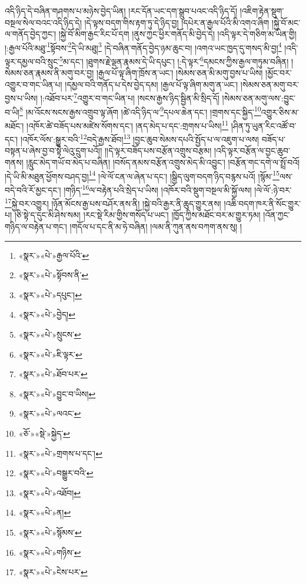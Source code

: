 འདི་ཉིད་དེ་བཞིན་གཤགས་པ་མཉེས་བྱེད་ཡིན། །རང་དོན་ཡང་དག་སྒྲུབ་པའང་འདི་ཉིད་དོ། །འཇིག་རྟེན་སྡུག་བསྔལ་སེལ་བའང་འདི་ཉིད་དེ། །དེ་ལྟས་བདག་གིས་རྟག་ཏུ་དེ་ཉིད་བྱ། །དཔེར་ན་རྒྱལ་པོའི་མི་འགའ་ཞིག །སྐྱེ་བོ་མང་ལ་གནོད་བྱེད་ཀྱང་། །སྐྱེ་བོ་མིག་རྒྱང་རིང་པོ་དག །ནུས་ཀྱང་ཕྱིར་གནོད་མི་བྱེད་དེ། །འདི་ལྟར་དེ་གཅིག་མ་ཡིན་གྱི། །:རྒྱལ་པོའི་མཐུ་\footnote{«སྣར་»«པེ་»རྒྱལ་པོའི་}སྟོབས་\footnote{«སྣར་»«པེ་»སྟོབས་ནི་}དེ་ཡི་མཐུ།\footnote{«སྣར་»«པེ་»དཔུང་།} །དེ་བཞིན་གནོད་བྱེད་ཉམ་ཆུང་བ། །འགའ་ཡང་ཁྱད་དུ་གསད་མི་བྱ།\footnote{«སྣར་»«པེ་»བྱེད།} །འདི་ལྟར་དམྱལ་བའི་སྲུང་\footnote{«སྣར་»«པེ་»སྲུངས་}མ་དང་། །ཐུགས་རྗེ་ལྡན་རྣམས་དེ་ཡི་དཔུང་། །:དེ་ལྟར་\footnote{«སྣར་»«པེ་»ཇི་ལྟར་}དམངས་ཀྱིས་རྒྱལ་གཏུམ་བཞིན། །སེམས་ཅན་རྣམས་ནི་མགུ་བར་བྱ། །རྒྱལ་པོ་ལྟ་ཞིག་ཁྲོས་ན་ཡང་། །སེམས་ཅན་མི་མགུ་བྱས་པ་ཡིས། །མྱོང་བར་འགྱུར་བ་གང་ཡིན་པ། །དམྱལ་བའི་གནོད་པ་དེས་བྱེད་དམ། །རྒྱལ་པོ་ལྟ་ཞིག་མགུ་ན་ཡང་། །སེམས་ཅན་མགུ་བར་བྱས་པ་ཡིས། །:འཐོབ་པར་\footnote{«སྣར་»«པེ་»ཐོབ་པར་}འགྱུར་བ་གང་ཡིན་པ། །སངས་རྒྱས་ཉིད་སྦྱིན་མི་སྲིད་དོ། །སེམས་ཅན་མགུ་ལས་:བྱུང་བ་ཡི།\footnote{«སྣར་»«པེ་»བྱུང་བ་ཡིས།} །མ་འོངས་སངས་རྒྱས་འགྲུབ་ལྟ་ཞོག །ཚེ་འདི་ཉིད་ལ་\footnote{«སྣར་»«པེ་»ལའང་}དཔལ་ཆེན་དང་། །གྲགས་དང་སྐྱིད་\footnote{«ཅོ་»«སྡེ་»སྐྱེད་}འགྱུར་ཅིས་མ་མཐོང་། །འཁོར་ཚེ་བཟོད་པས་མཛེས་སོགས་དང་། །ནད་མེད་པ་དང་:གྲགས་པ་ཡིས།\footnote{«སྣར་»«པེ་»གྲགས་པ་དང་།} །ཤིན་ཏུ་ཡུན་རིང་འཚོ་བ་དང་། །འཁོར་ལོས་:སྒྱུར་བའི་\footnote{«སྣར་»«པེ་»བསྒྱུར་བའི་}བདེ་རྒྱས་ཐོབ།\footnote{«སྣར་»«པེ་»འཐོབ།} །བྱང་ཆུབ་སེམས་དཔའི་སྤྱོད་པ་ལ་འཇུག་པ་ལས། བཟོད་པ་བསྟན་པ་ཞེས་བྱ་བ་སྟེ་ལེའུ་དྲུག་པའོ།། །།དེ་ལྟར་བཟོད་པས་བརྩོན་འགྲུས་བརྩམ། །འདི་ལྟར་བརྩོན་ལ་བྱང་ཆུབ་གནས། །རླུང་མེད་གཡོ་བ་མེད་པ་བཞིན། །བསོད་ནམས་བརྩོན་འགྲུས་མེད་མི་འབྱུང་། །བརྩོན་གང་དགེ་ལ་སྤྲོ་བའོ། །དེ་ཡི་མི་མཐུན་ཕྱོགས་བཤད་བྱ།\footnote{«སྣར་»«པེ་»ན།} །ལེ་ལོ་ངན་ལ་ཞེན་པ་དང་། །སྒྱིད་ལུག་བདག་ཉིད་བརྙས་པའོ། །སྙོམ་\footnote{«སྣར་»«པེ་»སྙོམས་}ལས་བདེ་བའི་རོ་མྱང་དང་། །གཉིད་\footnote{«སྣར་»«པེ་»གཉིས་}ལ་བརྟེན་པའི་སྲེད་པ་ཡིས། །འཁོར་བའི་སྡུག་བསྔལ་མི་སྐྱོ་ལས། །ལེ་ལོ་:ཉེ་བར་\footnote{«སྣར་»«པེ་»ངེས་པར་}སྐྱེ་བར་འགྱུར། །ཉོན་མོངས་རྒྱ་པས་བཤོར་ནས་ནི། །སྐྱེ་བའི་རྒྱར་ནི་ཆུད་གྱུར་ནས། །འཆི་བདག་ཁར་ནི་སོང་གྱུར་པ། །ཅི་སྟེ་ད་དུང་མི་ཤེས་སམ། །རང་སྡེ་རིམ་གྱིས་གསོད་པ་ཡང་། །ཁྱོད་ཀྱིས་མཐོང་བར་མ་གྱུར་ཏམ། །འོན་ཀྱང་གཉིད་ལ་བརྟེན་པ་གང་། །གདོལ་པ་དང་ནི་མ་ཧེ་བཞིན། །ལམ་ནི་ཀུན་ནས་བཀག་ནས་སུ། །
